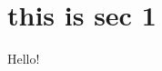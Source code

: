 \documentclass[12pt, letterpaper]{article}
\begin{document}
\maketitle

\section{this is sec 1}

Hello!
\end{document}
